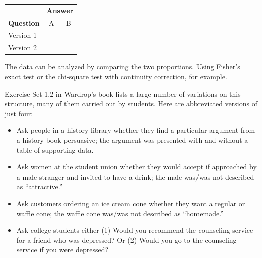 \documentclass[twoside,openany]{tufte-book}
\begin{document}
\begin{table}[!ht]
\begin{center}
\begin{tabular}{l|cc}
& \multicolumn{2}{c}{\textbf{Answer}}\\
\textbf{Question}  & A & B \\
  \hline
Version 1 &  &  \\
Version 2 &  &  \\
\end{tabular}
\end{center}
\end{table}

The data can be analyzed by comparing the two proportions. Using Fisher's exact test or the chi-square test with continuity correction, for example.

\newpage

Exercise Set 1.2 in Wardrop's book lists a large number of variations on this structure, many of them carried out by students.  Here are abbreviated versions of just four:

\renewcommand{\labelitemi}{$\closedsucc$}
\begin{itemize}[leftmargin=1cm, itemsep=.2em]
\item Ask people in a history library whether they find a particular argument from a history book persuasive; the argument was presented with and without a table of supporting data.
\item Ask women at the student union whether they would accept if approached by a male stranger and invited to have a drink; the male was/was not described as ``attractive.''
\item Ask customers ordering an ice cream cone whether they want a regular or waffle cone; the waffle cone was/was not described as ``homemade.''
\item Ask college students either (1) Would you recommend the counseling service for a friend who was depressed? Or (2) Would you go to the counseling service if you were depressed?
\end{itemize}
\end{document}
